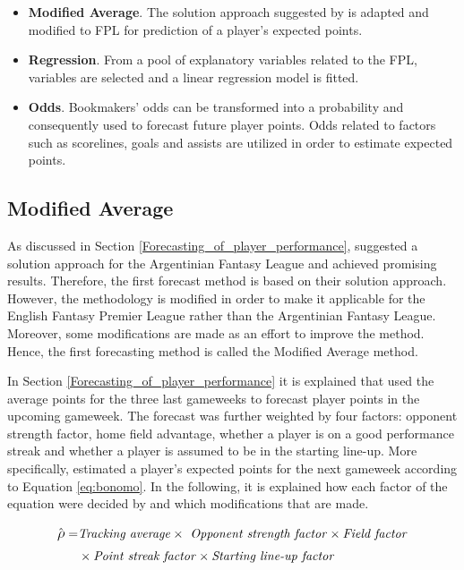 \begin{itemize}
    \item \textbf{Modified Average}. The solution approach suggested by \cite{Bonomo} is adapted and modified to FPL for prediction of a player's expected points.
    \item \textbf{Regression}. From a pool of explanatory variables related to the FPL, variables are selected and a linear regression model is fitted. 
    \item \textbf{Odds}. Bookmakers' odds can be transformed into a probability and consequently used to forecast future player points. Odds related to factors such as scorelines, goals and assists are utilized in order to estimate expected points. 
\end{itemize}


\subsection{Modified Average} \label{Sol_approach_Modified_Average}

As discussed in Section \ref{Forecasting_of_player_performance}, \cite{Bonomo} suggested a solution approach for the Argentinian Fantasy League and achieved promising results. Therefore, the first forecast method is based on their solution approach. However, the methodology is modified in order to make it applicable for the English Fantasy Premier League rather than the Argentinian Fantasy League. Moreover, some modifications are made as an effort to improve the method. Hence, the first forecasting method is called the Modified Average method.

\newpar

In Section \ref{Forecasting_of_player_performance} it is explained that  \cite{Bonomo} used the average points for the three last gameweeks to forecast player points in the upcoming gameweek. The forecast was further weighted by four factors: opponent strength factor, home field advantage, whether a player is on a good performance streak and whether a player is assumed to be in the starting line-up. More specifically, \cite{Bonomo} estimated a player's expected points for the next gameweek according to Equation \ref{eq:bonomo}. In the following, it is explained how each factor of the equation were decided by \cite{Bonomo} and which modifications that are made.

\begin{equation}
\begin{split}
    \hat{\rho}  = & \textrm{\textit{Tracking average}} \times \textrm{\textit{ Opponent strength factor}} \times \textrm{\textit{Field factor}} \\
        & \times \textrm{\textit{Point streak factor}} \times \textrm{\textit{Starting line-up factor}}
\end{split}
\label{eq:bonomo}
\end{equation}

